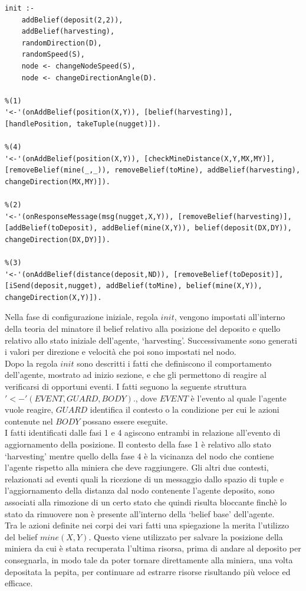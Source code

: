 \medskip
\begin{lstlisting}[firstnumber=1,label={lst:Miner},caption={Teoria minatore}]
init :-
    addBelief(deposit(2,2)),
    addBelief(harvesting),
    randomDirection(D),
    randomSpeed(S),
    node <- changeNodeSpeed(S),
    node <- changeDirectionAngle(D).

%(1)
'<-'(onAddBelief(position(X,Y)), [belief(harvesting)], [handlePosition, takeTuple(nugget)]).

%(4)
'<-'(onAddBelief(position(X,Y)), [checkMineDistance(X,Y,MX,MY)], [removeBelief(mine(_,_)), removeBelief(toMine), addBelief(harvesting), changeDirection(MX,MY)]).

%(2)
'<-'(onResponseMessage(msg(nugget,X,Y)), [removeBelief(harvesting)], [addBelief(toDeposit), addBelief(mine(X,Y)), belief(deposit(DX,DY)), changeDirection(DX,DY)]).

%(3)
'<-'(onAddBelief(distance(deposit,ND)), [removeBelief(toDeposit)], [iSend(deposit,nugget), addBelief(toMine), belief(mine(X,Y)), changeDirection(X,Y)]).
\end{lstlisting}
Nella fase di configurazione iniziale, regola $init$, vengono impostati all'interno della teoria del minatore il belief relativo alla posizione del deposito e quello relativo allo stato iniziale dell'agente, `harvesting'. Successivamente sono generati i valori per direzione e velocità che poi sono impostati nel nodo.
\\
Dopo la regola $init$ sono descritti i fatti che definiscono il comportamento dell'agente, mostrato ad inizio sezione, e che gli permettono di reagire al verificarsi di opportuni eventi.
I fatti seguono la seguente struttura $'<-'(EVENT, GUARD, BODY).$, dove $EVENT$ è l'evento al quale l'agente vuole reagire, $GUARD$ identifica il contesto o la condizione per cui le azioni contenute nel $BODY$ possano essere eseguite.
\\
I fatti identificati dalle fasi 1 e 4 agiscono entrambi in relazione all'evento di aggiornamento della posizione. Il contesto della fase 1 è relativo allo stato `harvesting' mentre quello della fase 4 è la vicinanza del nodo che contiene l'agente rispetto alla miniera che deve raggiungere.
Gli altri due contesti, relazionati ad eventi quali la ricezione di un messaggio dallo spazio di tuple e l'aggiornamento della distanza dal nodo contenente l'agente deposito, sono associati alla rimozione di un certo stato che quindi risulta bloccante finchè lo stato da rimuovere non è presente all'interno della `belief base' dell'agente.
\\
Tra le azioni definite nei corpi dei vari fatti una spiegazione la merita l'utilizzo del belief $mine(X,Y)$. Questo viene utilizzato per salvare la posizione della miniera da cui è stata recuperata l'ultima risorsa, prima di andare al deposito per consegnarla, in modo tale da poter tornare direttamente alla miniera, una volta depositata la pepita, per continuare ad estrarre risorse risultando più veloce ed efficace.


